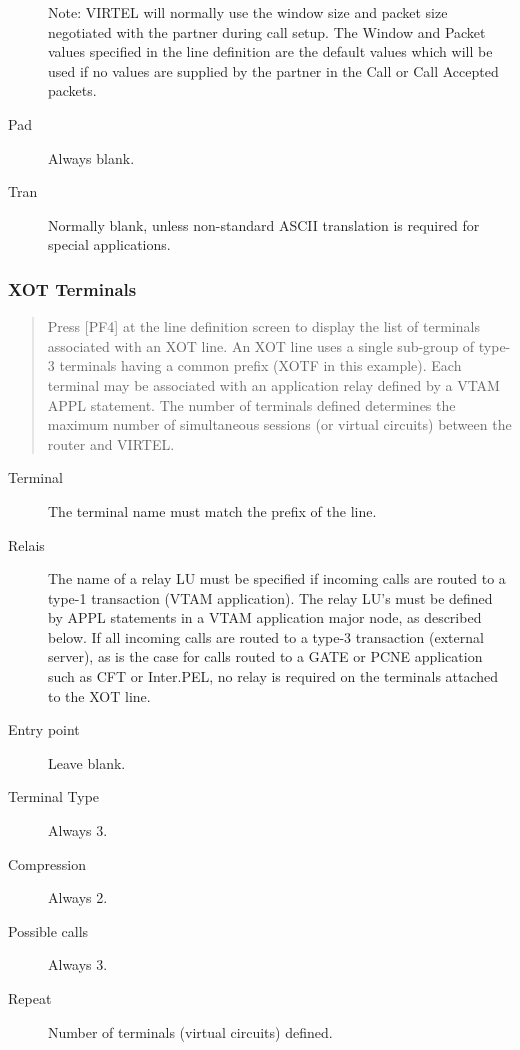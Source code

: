 \documentclass[letterpaper,10pt,english]{sphinxmanual}
\begin{document}
\begin{description}
Note: VIRTEL will normally use the window size and packet size negotiated with the partner during call setup. The Window and Packet values specified in the line definition are the default values which will be used if no values are supplied by the partner in the Call or Call Accepted packets.

\item[{Pad}] \leavevmode
Always blank.

\item[{Tran}] \leavevmode
Normally blank, unless non-standard ASCII translation is required for special applications.

\end{description}


\subsubsection{XOT Terminals}
\label{\detokenize{connectivity_guide:xot-terminals}}\begin{quote}

Press {[}PF4{]} at the line definition screen to display the list of terminals associated with an XOT line. An XOT line uses a single sub-group of type-3 terminals having a common prefix (XOTF in this example). Each terminal may be associated with an application relay defined by a VTAM APPL statement. The number of terminals defined determines the maximum number of simultaneous sessions (or virtual circuits) between the router and VIRTEL.
\end{quote}


\begin{description}
\item[{Terminal}] \leavevmode
The terminal name must match the prefix of the line.

\item[{Relais}] \leavevmode
The name of a relay LU must be specified if incoming calls are
routed to a type-1 transaction (VTAM application). The relay LU’s
must be defined by APPL statements in a VTAM application major node,
as described below. If all incoming calls are routed to a type-3
transaction (external server), as is the case for calls routed to a
GATE or PCNE application such as CFT or Inter.PEL, no relay is
required on the terminals attached to the XOT line.

\item[{Entry point}] \leavevmode
Leave blank.

\item[{Terminal Type}] \leavevmode
Always 3.

\item[{Compression}] \leavevmode
Always 2.

\item[{Possible calls}] \leavevmode
Always 3.

\item[{Repeat}] \leavevmode
Number of terminals (virtual circuits) defined.

\end{description}
\end{document}
